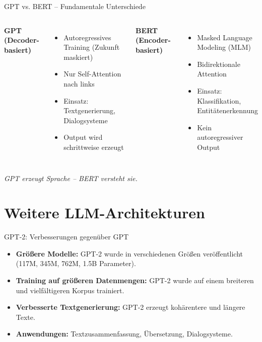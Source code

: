\documentclass[aspectratio=1610, xcolor=dvipsnames, 9pt]{beamer}
\begin{document}
\begin{frame}{GPT vs. BERT – Fundamentale Unterschiede}
  \begin{columns}
      \textbf{GPT (Decoder-basiert)}
      \begin{itemize}
          \item Autoregressives Training (Zukunft maskiert)
          \item Nur Self-Attention nach links
          \item Einsatz: Textgenerierung, Dialogsysteme
          \item Output wird schrittweise erzeugt
      \end{itemize}
      
      \textbf{BERT (Encoder-basiert)}
      \begin{itemize}
          \item Masked Language Modeling (MLM)
          \item Bidirektionale Attention
          \item Einsatz: Klassifikation, Entitätenerkennung
          \item Kein autoregressiver Output
      \end{itemize}
  \end{columns}
  \vspace{0.4cm}
  \begin{center}
      \textit{GPT erzeugt Sprache -- BERT versteht sie.}
  \end{center}
\end{frame}

\section{Weitere LLM-Architekturen}

\begin{frame}{GPT-2: Verbesserungen gegenüber GPT}
  \begin{itemize}
    \item \textbf{Größere Modelle:} GPT-2 wurde in verschiedenen Größen veröffentlicht (117M, 345M, 762M, 1.5B Parameter).
    \item \textbf{Training auf größeren Datenmengen:} GPT-2 wurde auf einem breiteren und vielfältigeren Korpus trainiert.
    \item \textbf{Verbesserte Textgenerierung:} GPT-2 erzeugt kohärentere und längere Texte.
    \item \textbf{Anwendungen:} Textzusammenfassung, Übersetzung, Dialogsysteme.
  \end{itemize}
\end{frame}
\end{document}
